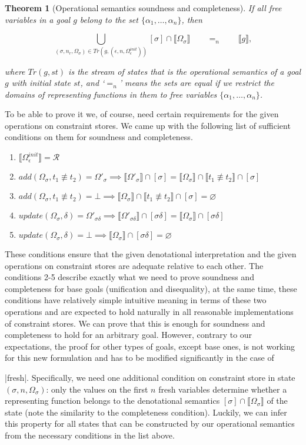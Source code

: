 \documentclass[submission,copyright,creativecommons]{eptcs}
\newtheorem{theorem}{Theorem}
\newcommand*{\SavedLstInline}{}
\DeclareRobustCommand*{\lstinline}{%
  \ifmmode
    \let\SavedBGroup\bgroup
    \def\bgroup{%
      \let\bgroup\SavedBGroup
      \hbox\bgroup
    }%
  \fi
  \SavedLstInline
}
\newcommand{\sembr}[1]{\llbracket{#1}\rrbracket}
\newcommand{\diseq}{\not\equiv}
\newcommand{\reprfunset}{\mathcal{R}}
\newcommand{\cstore}{\Omega}
\newcommand{\cstoreinit}{\cstore_\epsilon^{init}}
\newcommand{\csadd}[3]{add(#1, #2 \diseq #3)}  %
\newcommand{\csupdate}[2]{update(#1, #2)}  %
\let\emptyset\varnothing
\begin{document}
\begin{theorem}[Operational semantics soundness and completeness]
If all free variables in a goal $g$ belong to the set $\{\alpha_1,\dots,\alpha_n\}$, then

\[
\bigcup_{(\sigma, n_r, \cstore_\sigma) \in Tr(g, (\epsilon, n, \cstoreinit))}  {[\sigma] \cap \sembr{\cstore_\sigma}}  \qquad =_n \qquad \sembr{g},
\]

where $Tr(g, st)$ is the stream of states that is the operational semantics of a goal $g$ with initial state $st$, and `$=_n$' means the sets are equal if we
restrict the domains of representing functions in them to free variables $\{\alpha_1,\dots,\alpha_n\}$.
\end{theorem}

To be able to prove it we, of course, need certain requirements for the given operations on constraint stores. We came up with the following list of sufficient
conditions on them for soundness and completeness.

\begin{enumerate}
\item $\sembr{\cstoreinit} = \reprfunset$
\item $\csadd{\cstore_\sigma}{t_1}{t_2} = \cstore'_\sigma \implies \sembr{\cstore'_\sigma} \cap [\sigma] = \sembr{\cstore_\sigma} \cap \sembr{t_1 \diseq t_2} \cap [\sigma]$
\item $\csadd{\cstore_\sigma}{t_1}{t_2} = \bot \implies \sembr{\cstore_\sigma} \cap \sembr{t_1 \diseq t_2} \cap [\sigma] = \emptyset$
\item $\csupdate{\cstore_\sigma}{\delta} = \cstore'_{\sigma \delta} \implies \sembr{\cstore'_{\sigma \delta}} \cap [\sigma \delta] = \sembr{\cstore_\sigma} \cap [\sigma \delta]$
\item $\csupdate{\cstore_\sigma}{\delta} = \bot \implies \sembr{\cstore_\sigma} \cap [\sigma \delta] = \emptyset$
\end{enumerate}

These conditions ensure that the given denotational interpretation and the given operations on constraint stores are adequate relative to each other.
The conditions 2-5 describe exactly what we need to prove soundness and completeness for base goals (unification and disequality), at the same time,
these conditions have relatively simple intuitive meaning in terms of these two operations and are expected to hold naturally in all reasonable
implementations of constraint stores. We can prove that this is enough for soundness and completeness to hold for an arbitrary goal. However,
contrary to our expectations, the proof for other types of goals, except base ones, is not working for this new formulation and has to be modified
significantly in the case of \lstinline|fresh|. Specifically, we need one additional condition on constraint store in state $(\sigma, n, \cstore_\sigma)$:
only the values on the first $n$ fresh variables determine whether a representing function belongs to the denotational semantics $[\sigma] \cap \sembr{\cstore_\sigma}$
of the state (note the similarity to the completeness condition). Luckily, we can infer this property for all states that can be constructed by our operational
semantics from the necessary conditions in the list above.
\end{document}
